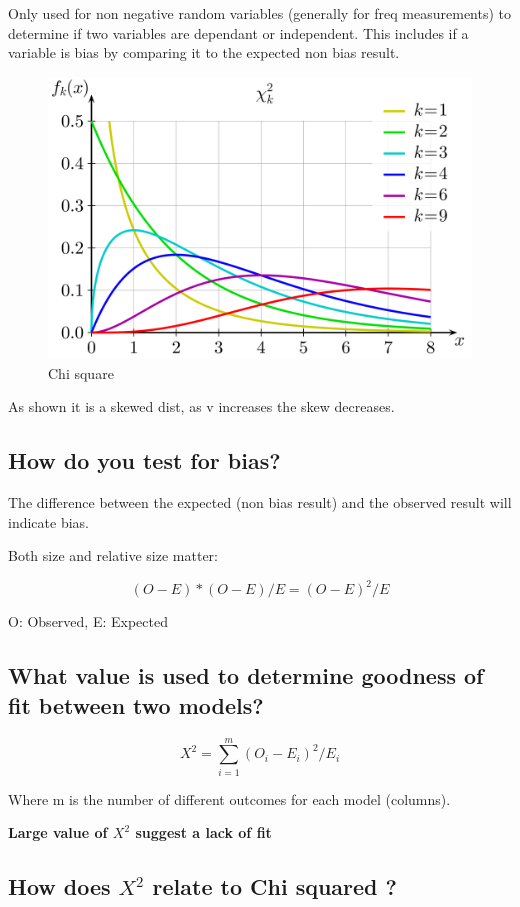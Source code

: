 \documentclass[11pt]{scrartcl} %
\begin{document}
Only used for non negative random variables (generally for freq
measurements) to determine if two variables are dependant or
independent. This includes if a variable is bias by comparing it to the
expected non bias result.

\begin{figure}[h] %
	\centering
	\includegraphics[width=0.5\columnwidth]{Chi-square_pdf.png} %
	\caption{Chi square}
\end{figure}

As shown it is a skewed dist, as v increases the skew decreases.

\subsection{How do you test for
bias?}

The difference between the expected (non bias result) and the observed
result will indicate bias.

Both size and relative size matter:

\begin{equation}
	(O-E) * (O-E)/E = (O-E)^2/E
\end{equation}

O: Observed, E: Expected

\subsection{What value is used to determine goodness of fit between
two
models?}

\begin{equation}
	X^2 = \sum^{m}_{i=1} (O_i - E_i)^2/E_i
\end{equation}

Where m is the number of different outcomes for each model (columns).

\textbf{Large value of \(X^2\) suggest a lack of fit}

\subsection{\texorpdfstring{How does \(X^2\) relate to Chi squared
?}{How does X\^{}2 relate to Chi squared ?}}
\end{document}
